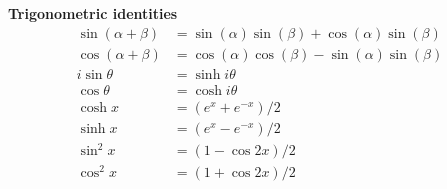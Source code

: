 \documentclass[10pt]{article} %
\begin{document}
\begin{multicols}{4}
{\begin{flushleft}
            \textbf{Trigonometric identities}
            \begin{align*}
                \sin(\alpha +\beta) & = \sin(\alpha)\sin(\beta) + \cos(\alpha)\sin(\beta) \\
                \cos(\alpha+\beta)  & = \cos(\alpha)\cos(\beta) - \sin(\alpha)\sin(\beta) \\
                i \sin \theta       & = \sinh {i\theta}                                   \\
                \cos \theta         & = \cosh {i\theta}                                   \\
                \cosh x             & = (e^x+e^{-x})/2                                    \\
                \sinh x             & = (e^x-e^{-x})/2                                    \\
                \sin^2 x            & = (1-\cos{2x})/2                                    \\
                \cos^2 x            & = (1+\cos{2x})/2
            \end{align*}

        \end{flushleft}
    }
\end{multicols}
\end{document}
